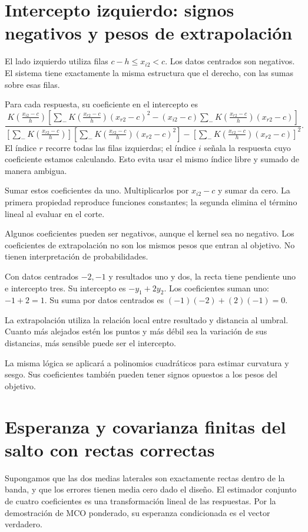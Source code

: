 \documentclass[11pt,a4paper]{article}
\begin{document}
\clearpage
\section{Intercepto izquierdo: signos negativos y pesos de extrapolación}\label{unidad27}
El lado izquierdo utiliza filas
\(c-h\le x_{i2}<c\).
Los datos centrados son negativos.
El sistema tiene exactamente la misma estructura
que el derecho, con las sumas sobre esas filas.

Para cada respuesta, su coeficiente en el intercepto es
\[
\frac{
K(\frac{x_{i2}-c}{h})
\left[
\sum_-K(\frac{x_{r2}-c}{h})(x_{r2}-c)^2
-(x_{i2}-c)\sum_-K(\frac{x_{r2}-c}{h})(x_{r2}-c)
\right]
}{
\left[\sum_-K(\frac{x_{r2}-c}{h})\right]
\left[\sum_-K(\frac{x_{r2}-c}{h})(x_{r2}-c)^2\right]
-\left[\sum_-K(\frac{x_{r2}-c}{h})(x_{r2}-c)\right]^2
}.
\]
El índice \(r\) recorre todas las filas izquierdas;
el índice \(i\) señala la respuesta cuyo
coeficiente estamos calculando.
Esto evita usar el mismo índice libre
y sumado de manera ambigua.

Sumar estos coeficientes da uno.
Multiplicarlos por \(x_{i2}-c\) y sumar da cero.
La primera propiedad reproduce funciones constantes;
la segunda elimina el término lineal
al evaluar en el corte.

Algunos coeficientes pueden ser negativos,
aunque el kernel sea no negativo.
Los coeficientes de extrapolación no son
los mismos pesos que entran al objetivo.
No tienen interpretación de probabilidades.

\begin{ejemplo}
Con datos centrados \(-2,-1\) y resultados uno y dos,
la recta tiene pendiente uno e intercepto tres.
Su intercepto es \(-y_1+2y_2\).
Los coeficientes suman uno:
\(-1+2=1\).
Su suma por datos centrados es
\((-1)(-2)+(2)(-1)=0\).
\end{ejemplo}
La extrapolación utiliza la relación local
entre resultado y distancia al umbral.
Cuanto más alejados estén los puntos
y más débil sea la variación de sus distancias,
más sensible puede ser el intercepto.

La misma lógica se aplicará a polinomios
cuadráticos para estimar curvatura y sesgo.
Sus coeficientes también pueden tener
signos opuestos a los pesos del objetivo.

\clearpage
\section{Esperanza y covarianza finitas del salto con rectas correctas}\label{unidad28}
Supongamos que las dos medias laterales
son exactamente rectas dentro de la banda,
y que los errores tienen media cero dado el diseño.
El estimador conjunto de cuatro coeficientes
es una transformación lineal de las respuestas.
Por la demostración de MCO ponderado,
su esperanza condicionada es el vector verdadero.
\end{document}
